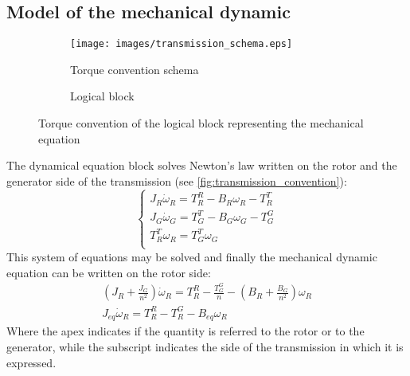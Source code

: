 \subsection[Mechanical dynamic]{Model of the mechanical dynamic}
\begin{figure}
  \centering
  \begin{subfigure}{0.6\columnwidth}
    \centering
    \texttt{[image: images/transmission\_schema.eps]}
    \caption{Torque convention schema}
    \label{fig:transmission_convention}
  \end{subfigure}
  
  \begin{subfigure}{0.5\columnwidth}
    \centering
      
      \caption{Logical block}
    \label{fig:d_mech_equation_block}
  \end{subfigure}
  \caption{Torque convention of the logical block representing the mechanical equation}
\end{figure}
The dynamical equation block solves Newton's law written on the rotor and the generator side of the transmission (see \autoref{fig:transmission_convention}):
\begin{equation}
    \begin{cases}
      J_R \dot{\omega}_R = T_R^R - B_R\omega_R - T_R^T\\
      J_G \dot{\omega}_G = T_G^T - B_G\omega_G - T_G^G\\
      T_R^T\omega_R = T_G^T\omega_G\\
    \end{cases}
\end{equation}
This system of equations may be solved and finally the mechanical dynamic equation can be written on the rotor side:
\begin{gather}
    \left(J_R + \frac{J_G}{n^2}\right) \dot{\omega}_R = T_R^R - \frac{T_G^G}{n} - \left(B_R + \frac{B_G}{n^2}\right)\omega_R \\
    J_{eq} \dot{\omega}_R = T_R^R - T_R^G - B_{eq}\omega_R
    \label{eq:mech_eq}
\end{gather}
Where the apex indicates if the quantity is referred to the rotor or to the generator, while the subscript indicates the side of the transmission in which it is expressed.

